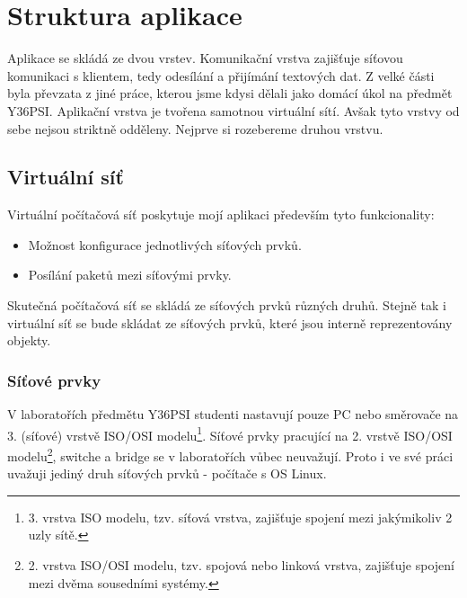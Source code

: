 \section{Struktura aplikace}

Aplikace se skládá ze dvou vrstev. Komunikační vrstva zajišťuje síťovou komunikaci s klientem, tedy odesílání a přijímání textových dat. Z velké části byla převzata z jiné práce, kterou jsme kdysi dělali jako domácí úkol na předmět Y36PSI. Aplikační vrstva je tvořena samotnou virtuální sítí. Avšak tyto vrstvy od sebe nejsou striktně odděleny. Nejprve si rozebereme druhou vrstvu.

\subsection{Virtuální síť}
Virtuální počítačová síť poskytuje mojí aplikaci především tyto funkcionality:
\begin{itemize}
 \item Možnost konfigurace jednotlivých síťových prvků.
 \item Posílání paketů mezi síťovými prvky.
\end{itemize}
Skutečná počítačová síť se skládá ze síťových prvků různých druhů. Stejně tak i virtuální síť se bude skládat ze síťových prvků, které jsou interně reprezentovány objekty.
\subsubsection{Síťové prvky}
V laboratořích předmětu Y36PSI studenti nastavují pouze PC nebo směrovače na 3. (síťové) vrstvě ISO/OSI modelu\footnote{3. vrstva ISO modelu, tzv. síťová vrstva, zajišťuje spojení mezi jakýmikoliv 2 uzly sítě.}. Síťové prvky pracující na 2. vrstvě ISO/OSI modelu\footnote{2. vrstva ISO/OSI modelu, tzv. spojová nebo linková vrstva, zajišťuje spojení mezi dvěma sousedními systémy.}, switche a bridge se v laboratořích vůbec neuvažují. Proto i ve své práci uvažuji jediný druh síťových prvků - počítače s OS Linux.
